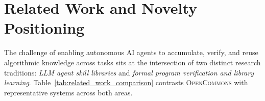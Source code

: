 \documentclass[10pt,twocolumn]{article}
\begin{document}
\section{Related Work and Novelty Positioning}
\label{sec:related_work}

The challenge of enabling autonomous AI agents to accumulate, verify, and reuse algorithmic knowledge across tasks sits at the intersection of two distinct research traditions: \emph{LLM agent skill libraries} and \emph{formal program verification and library learning}. Table~\ref{tab:related_work_comparison} contrasts \textsc{OpenCommons} with representative systems across both areas.

\begin{table}[t]
\centering
\caption{\textbf{Architectural comparison of \textsc{OpenCommons} against prior agent skill libraries and formal verification frameworks.} Unlike unverified text/code repositories that suffer from keyword collisions and silent bug propagation, or formal IR lifters that reject $>80\%$ of imperative scientific Python, \textsc{OpenCommons} achieves $100\%$ native-code coverage with sub-millisecond behavioral equivalence indexing, live I/O-probe retrieval, asynchronous adversarial quarantine, and lock-free CRDT federation.}
\label{tab:related_work_comparison}
\scriptsize
{}
\end{table}
\end{document}
